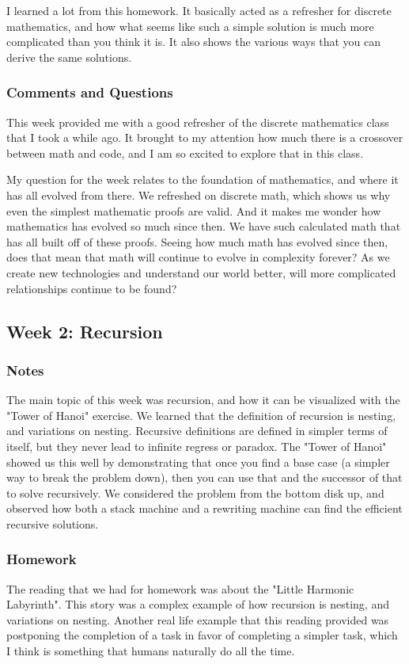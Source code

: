 \documentclass{article}
\theoremstyle{theorem}
\theoremstyle{definition}
\theoremstyle{remark}
\begin{document}
I learned a lot from this homework. It basically acted as a refresher for discrete mathematics, and 
how what seems like such a simple solution is much more complicated than you think it is. It also shows 
the various ways that you can derive the same solutions.


\subsubsection*{Comments and Questions}

This week provided me with a good refresher of the discrete mathematics class that I took a while ago. It brought to my attention how much
there is a crossover between math and code, and I am so excited to explore that in this class.

My question for the week relates to the foundation of mathematics, and where it has all evolved from there. We refreshed on discrete math,
which shows us why even the simplest mathematic proofs are valid. And it makes me wonder how mathematics has evolved so much since then. We have
such calculated math that has all built off of these proofs. Seeing how much math has evolved since then, does that mean that math will continue to
evolve in complexity forever? As we create new technologies and understand our world better, will more complicated relationships continue to be found?

\subsection{Week 2: Recursion}
\subsubsection*{Notes}
The main topic of this week was recursion, and how it can be visualized with the "Tower of Hanoi" exercise.
We learned that the definition of recursion is nesting, and variations on nesting. Recursive definitions are
defined in simpler terms of itself, but they never lead to infinite regress or paradox. The "Tower of Hanoi" showed
us this well by demonstrating that once you find a base case (a simpler way to break the problem down), then you can
use that and the successor of that to solve recursively. We considered the problem from the bottom disk up, and observed
how both a stack machine and a rewriting machine can find the efficient recursive solutions.

\subsubsection*{Homework}
The reading that we had for homework was about the "Little Harmonic Labyrinth". This story was a complex example of how
recursion is nesting, and variations on nesting. Another real life example that this reading provided was postponing the 
completion of a task in favor of completing a simpler task, which I think is something that humans naturally do all the time.
\end{document}

